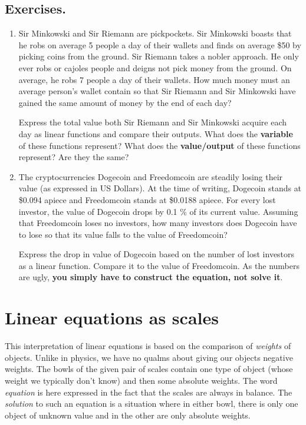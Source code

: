 \documentclass[a4paper,11pt]{article}
\begin{document}
\subsection*{Exercises.}
\begin{enumerate}[topsep=0pt,label=\arabic*.]
 \item Sir Minkowski and Sir Riemann are pickpockets. Sir Minkowski boasts that
  he robs on average 5 people a day of their wallets and finds on average \$50
  by picking coins from the ground. Sir Riemann takes a nobler approach. He only
  ever robs or cajoles people and deigns not pick money from the ground. On
  average, he robs 7 people a day of their wallets. How much money must an
  average person's wallet contain so that Sir Riemann and Sir Minkowski have
  gained the same amount of money by the end of each day?

  Express the total value both Sir Riemann and Sir Minkowski acquire each day as
  linear functions and compare their outputs. What does the \textbf{variable} of
  these functions represent? What does the \textbf{value/output} of these
  functions represent? Are they the same?

 \item The cryptocurrencies Dogecoin and Freedomcoin are steadily losing their
  value (as expressed in US Dollars). At the time of writing, Dogecoin stands at
  \$0.094 apiece and Freedomcoin stands at \$0.0188 apiece. For every lost
  investor, the value of Dogecoin drops by 0.1 \% of its current value. Assuming
  that Freedomcoin loses no investors, how many investors does Dogecoin have to
  lose so that its value falls to the value of Freedomcoin?

  Express the drop in value of Dogecoin based on the number of lost investors as
  a linear function. Compare it to the value of Freedomcoin. As the numbers are
  ugly, \textbf{you simply have to construct the equation, not solve it}.
\end{enumerate}

\section*{Linear equations as scales}

This interpretation of linear equations is based on the comparison of
\emph{weights} of objects. Unlike in physics, we have no qualms about giving our
objects negative weights. The bowls of the given pair of scales contain one type
of object (whose weight we typically don't know) and then some absolute weights.
The word \emph{equation} is here expressed in the fact that the scales are
always in balance. The \emph{solution} to such an equation is a situation where
in either bowl, there is only one object of unknown value and in the other are
only absolute weights.
\end{document}
